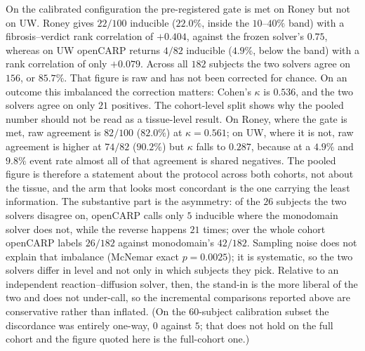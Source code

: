 \documentclass[11pt]{article}
\theoremstyle{definition}
\begin{document}
On the calibrated configuration the pre-registered gate is met on Roney but not
on UW. Roney gives $22/100$ inducible ($22.0\%$, inside the $10$--$40\%$ band)
with a fibrosis--verdict rank correlation of $+0.404$, against the frozen
solver's $0.75$, whereas on UW openCARP returns $4/82$ inducible ($4.9\%$, below
the band) with a rank correlation of only $+0.079$.
Across all $182$ subjects the two solvers agree on $156$, or $85.7\%$. That figure
is raw and has not been corrected for chance. On an outcome this imbalanced the
correction matters: Cohen's $\kappa$ is $0.536$, and the two solvers agree on
only $21$ positives. The cohort-level split shows why the pooled number should
not be read as a tissue-level result. On Roney, where the gate is met, raw
agreement is $82/100$ ($82.0\%$) at $\kappa=0.561$; on UW, where it is not, raw
agreement is higher at $74/82$ ($90.2\%$) but $\kappa$ falls to $0.287$,
because at a $4.9\%$ and $9.8\%$ event rate almost all of that agreement is
shared negatives. The pooled figure is therefore a statement about the protocol
across both cohorts, not about the tissue, and the arm that looks most
concordant is the one carrying the least information. The substantive part is
the asymmetry: of the $26$ subjects the two solvers disagree
on, openCARP calls only $5$ inducible where the monodomain solver does not, while
the reverse happens $21$ times; over the whole cohort openCARP labels $26/182$
against monodomain's $42/182$. Sampling noise does not explain that imbalance
(McNemar exact $p=0.0025$); it is systematic, so the two solvers differ in level
and not only in which subjects they pick. Relative to an independent reaction--diffusion
solver, then, the stand-in is the more liberal of the two and does not
under-call, so the incremental comparisons reported above are conservative
rather than inflated. (On the $60$-subject calibration subset the discordance was
entirely one-way, $0$ against $5$; that does not hold on the full cohort and the
figure quoted here is the full-cohort one.)
\end{document}
